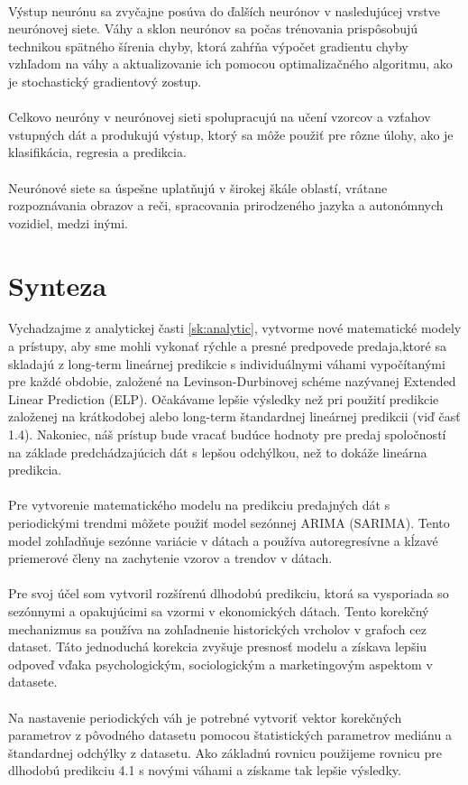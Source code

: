     \\
    Výstup neurónu sa zvyčajne posúva do ďalších neurónov v nasledujúcej vrstve neurónovej siete. Váhy a sklon
    neurónov sa počas trénovania prispôsobujú technikou spätného šírenia chyby, ktorá zahŕňa výpočet gradientu chyby
    vzhľadom na váhy a aktualizovanie ich pomocou optimalizačného algoritmu, ako je stochastický gradientový zostup.\\
    \\
    Celkovo neuróny v neurónovej sieti spolupracujú na učení vzorcov a vzťahov vstupných dát a produkujú výstup,
    ktorý sa môže použiť pre rôzne úlohy, ako je klasifikácia, regresia a predikcia.\\
    \\
    Neurónové siete sa úspešne uplatňujú v širokej škále oblastí, vrátane rozpoznávania obrazov a reči, spracovania
    prirodzeného jazyka a autonómnych vozidiel, medzi inými.
    \section{Synteza}
    Vychadzajme z analytickej časti \ref{sk:analytic}, vytvorme nové matematické modely a prístupy, aby sme mohli
    vykonať rýchle a presné predpovede predaja,ktoré sa skladajú z long-term lineárnej predikcie s individuálnymi
    váhami vypočítanými pre každé obdobie, založené na Levinson-Durbinovej schéme nazývanej Extended Linear Prediction
    (ELP). Očakávame lepšie výsledky než pri použití predikcie založenej na krátkodobej alebo long-term štandardnej
    lineárnej predikcii (viď časť 1.4). Nakoniec, náš prístup bude vracať budúce hodnoty pre predaj spoločností na základe
    predchádzajúcich dát s lepšou odchýlkou, než to dokáže lineárna predikcia.\\
    \\
    Pre vytvorenie matematického modelu na predikciu predajných dát s periodickými trendmi môžete použiť model
    sezónnej ARIMA (SARIMA). Tento model zohľadňuje sezónne variácie v dátach a používa autoregresívne a kĺzavé
    priemerové členy na zachytenie vzorov a trendov v dátach.\\
    \\
    Pre svoj účel som vytvoril rozšírenú dlhodobú predikciu, ktorá sa vysporiada so sezónnymi a opakujúcimi sa vzormi
    v ekonomických dátach. Tento korekčný mechanizmus sa používa na zohľadnenie historických vrcholov v grafoch cez dataset.
    Táto jednoduchá korekcia zvyšuje presnosť modelu a získava lepšiu odpoveď vďaka psychologickým,
    sociologickým a marketingovým aspektom v datasete.\\
    \\
    Na nastavenie periodických váh je potrebné vytvoriť vektor korekčných parametrov z pôvodného datasetu pomocou
    štatistických parametrov mediánu a štandardnej odchýlky z datasetu. Ako základnú rovnicu použijeme rovnicu pre
    dlhodobú predikciu 4.1 s novými váhami a získame tak lepšie výsledky.
